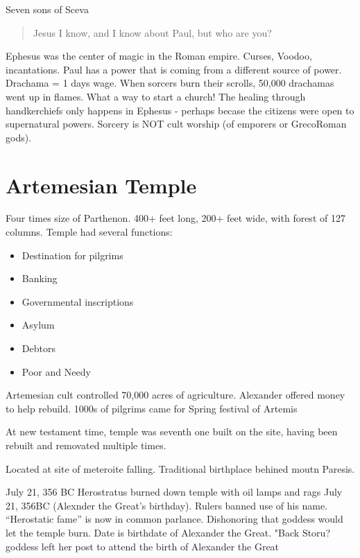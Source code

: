 \documentclass[
]{book}
\providecommand{\tightlist}{%
  \setlength{\itemsep}{0pt}\setlength{\parskip}{0pt}}
\begin{document}
Seven sons of Sceva

\begin{quote}
Jesus I know, and I know about Paul, but who are you?
\end{quote}

Ephesus was the center of magic in the Roman empire. Curses, Voodoo, incantations. Paul has a power that is coming from a different source of power. Drachama = 1 days wage. When sorcers burn their scrolls, 50,000 drachamas went up in flames. What a way to start a church! The healing through handkerchiefs only happens in Ephesus - perhaps becase the citizens were open to supernatural powers. Sorcery is NOT cult worship (of emporers or GrecoRoman gods).

\hypertarget{artemesian-temple}{%
\section{Artemesian Temple}\label{artemesian-temple}}

Four times size of Parthenon. 400+ feet long, 200+ feet wide, with forest of 127 columns. Temple had several functions:

\begin{itemize}
\tightlist
\item
  Destination for pilgrims
\item
  Banking
\item
  Governmental inscriptions
\item
  Asylum
\item
  Debtors
\item
  Poor and Needy
\end{itemize}

Artemesian cult controlled 70,000 acres of agriculture. Alexander offered money to help rebuild. 1000s of pilgrims came for Spring festival of Artemis

At new testament time, temple was seventh one built on the site, having been rebuilt and removated multiple times.

Located at site of meteroite falling. Traditional birthplace behined moutn Paresis.

July 21, 356 BC Herostratus burned down temple with oil lamps and rags July 21, 356BC (Alexnder the Great's birthday). Rulers banned use of his name. ``Herostatic fame'' is now in common parlance. Dishonoring that goddess would let the temple burn. Date is birthdate of Alexander the Great. "Back Storu? goddess left her post to attend the birth of Alexander the Great
\end{document}

